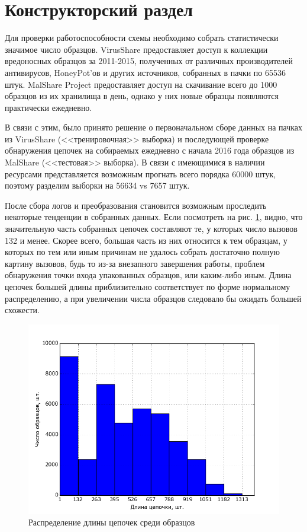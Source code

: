 \section {Конструкторский раздел}
Для проверки работоспособности схемы необходимо собрать статистически значимое число образцов. 
VirusShare \cite{VIRUSSHARE} предоставляет доступ к коллекции вредоносных образцов за 2011-2015, полученных от различных производителей антивирусов, HoneyPot'ов и других источников, собранных в пачки по 65536 штук.
MalShare Project \cite{MALSHARE} предоставляет доступ на скачивание  всего до 1000 образцов из их хранилища в день, однако у них новые образцы появляются практически ежедневно.

В связи с этим, было принято решение о первоначальном сборе данных на пачках из VirusShare (<<тренировочная>> выборка) и последующей проверке обнаружения цепочек на собираемых ежедневно с начала 2016 года образцов из MalShare (<<тестовая>> выборка). В связи с имеющимися в наличии ресурсами представляется возможным прогнать всего порядка 60000 штук, поэтому разделим выборки на 56634 vs 7657 штук.

После сбора логов и преобразования становится возможным проследить некоторые тенденции в собранных данных. Если посмотреть на рис. \ref{fig:seq_len_hist}, видно, что значительную часть собранных цепочек составляют те, у которых число вызовов 132 и менее. Скорее всего, большая часть из них относится к тем образцам, у которых по тем или иным причинам не удалось собрать достаточно полную картину вызовов, будь то из-за внезапного завершения работы, проблем обнаружения точки входа упакованных образцов, или каким-либо иным. Длина цепочек большей длины приблизительно соответствует по форме нормальному распределению, а при увеличении числа образцов следовало бы ожидать большей схожести.

\begin {figure}[ht]
        \centering
        \includegraphics[width=\linewidth] {img/sequence_len_hist.png}
        \caption {Распределение длины цепочек среди образцов}
        \label {fig:seq_len_hist}
\end {figure}

